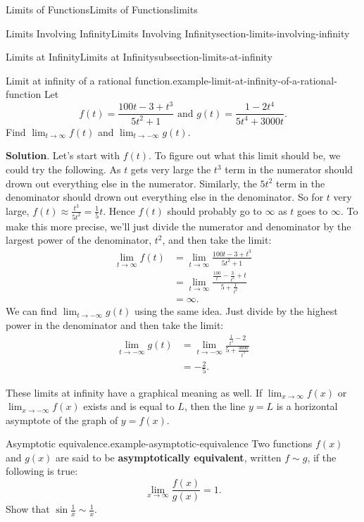 \documentclass[oneside,10pt,]{book}
\newcommand{\terminology}[1]{\textbf{#1}}
\numberwithin{equation}{section}
\begin{document}
\begin{chapterptx}{Limits of Functions}{}{Limits of Functions}{}{}{limits}
\begin{sectionptx}{Limits Involving Infinity}{}{Limits Involving Infinity}{}{}{section-limits-involving-infinity}
\begin{subsectionptx}{Limits at Infinity}{}{Limits at Infinity}{}{}{subsection-limits-at-infinity}
\begin{example}{Limit at infinity of a rational function.}{example-limit-at-infinity-of-a-rational-function}
\hypertarget{p-68}{}%
Let%
\begin{equation*}
f(t) = \frac{100t - 3 + t^{3}}{5t^{2}+1}\text{ and } g(t) = \frac{1-2t^{4}}{5t^{4}+3000t}.
\end{equation*}
Find \(\lim_{t\to\infty} f(t)\) and \(\lim_{t\to-\infty}g(t)\).%
\par\smallskip%
\noindent\textbf{Solution}.\hypertarget{solution-14}{}\quad%
\hypertarget{p-69}{}%
Let's start with \(f(t)\). To figure out what this limit should be, we could try the following. As \(t\) gets very large the \(t^{3}\) term in the numerator should drown out everything else in the numerator. Similarly, the \(5t^{2}\) term in the denominator should drown out everything else in the denominator. So for \(t\) very large, \(f(t)\approx\frac{t^{3}}{5t^{2}} = \frac{1}{5}t\). Hence \(f(t)\) should probably go to \(\infty\) as \(t\) goes to \(\infty\). To make this more precise, we'll just divide the numerator and denominator by the largest power of the denominator, \(t^{2}\), and then take the limit:%
%
\begin{align*}
\lim_{t\to\infty}f(t) & = \lim_{t\to\infty}\frac{100t-3+t^{3}}{5t^{2}+1} \\
& = \lim_{t\to\infty}\frac{\frac{100}{t} - \frac{3}{t^{2}}+t}{5+\frac{1}{t^{2}}} \\
& = \infty. 
\end{align*}
\hypertarget{p-70}{}%
We can find \(\lim_{t\to-\infty}g(t)\) using the same idea. Just divide by the highest power in the denominator and then take the limit:%
%
\begin{align*}
\lim_{t\to-\infty}g(t) & = \lim_{t\to-\infty}\frac{\frac{1}{t^{4}}-2}{5+\frac{3000}{t^{3}}} \\
& = -\frac{2}{5}. 
\end{align*}
\end{example}
\hypertarget{p-71}{}%
These limits at infinity have a graphical meaning as well. If \(\lim_{x\to\infty}f(x)\) or \(\lim_{x\to-\infty}f(x)\) exists and is equal to \(L\), then the line \(y=L\) is a horizontal asymptote of the graph of \(y=f(x)\).%
\begin{example}{Asymptotic equivalence.}{example-asymptotic-equivalence}%
\hypertarget{p-72}{}%
Two functions \(f(x)\) and \(g(x)\) are said to be \terminology{asymptotically equivalent}, written \(f\sim g\), if the following is true:%
\begin{equation*}
\lim_{x\to\infty}\frac{f(x)}{g(x)} = 1.
\end{equation*}
Show that \(\sin\frac{1}{x}\sim\frac{1}{x}\).%

\end{example}
\end{subsectionptx}
\end{sectionptx}
\end{chapterptx}
\end{document}
